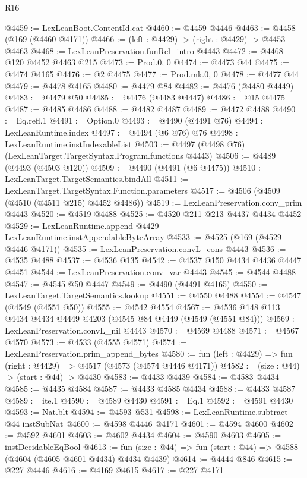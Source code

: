 \begin{lexlean}{R16}
\begin{coremodule}
@4459 := LexLeanBoot.ContentId.cat
@4460 := @4459 @4446
@4463 := @4458 (@169 (@4460 @4171))
@4466 := (left : @4429) -> (right : @4429) -> @4453 @4463
@4468 := LexLeanPreservation.funRel_intro @4443
@4472 := @4468 @120 @4452 @4463 @215
@4473 := Prod.{0, 0}
@4474 := @4473 @44
@4475 := @4474 @4165
@4476 := @2 @4475
@4477 := Prod.mk.{0, 0}
@4478 := @4477 @44
@4479 := @4478 @4165
@4480 := @4479 @84
@4482 := @4476 (@4480 @4449)
@4483 := @4479 @50
@4485 := @4476 (@4483 @4447)
@4486 := @15 @4475
@4487 := @4485 @4486
@4488 := @4482 @4487
@4489 := @4472 @4488
@4490 := Eq.refl.{1}
@4491 := Option.{0}
@4493 := @4490 (@4491 @76)
@4494 := LexLeanRuntime.index
@4497 := @4494 (@6 @76) @76
@4498 := LexLeanRuntime.instIndexableList
@4503 := @4497 (@4498 @76) (LexLeanTarget.TargetSyntax.Program.functions @4443)
@4506 := @4489 (@4493 (@4503 @120))
@4509 := @4490 (@4491 (@6 @4475))
@4510 := LexLeanTarget.TargetSemantics.bindAll
@4511 := LexLeanTarget.TargetSyntax.Function.parameters
@4517 := @4506 (@4509 (@4510 (@4511 @215) @4452 @4486))
@4519 := LexLeanPreservation.conv_prim @4443
@4520 := @4519 @4488
@4525 := @4520 @211 @213 @4437 @4434 @4452
@4529 := LexLeanRuntime.append @4429 LexLeanRuntime.instAppendableByteArray
@4533 := @4525 (@169 (@4529 @4446 @4171))
@4535 := LexLeanPreservation.convL_cons @4443
@4536 := @4535 @4488
@4537 := @4536 @135
@4542 := @4537 @150 @4434 @4436 @4447 @4451
@4544 := LexLeanPreservation.conv_var @4443
@4545 := @4544 @4488
@4547 := @4545 @50 @4447
@4549 := @4490 (@4491 @4165)
@4550 := LexLeanTarget.TargetSemantics.lookup
@4551 := @4550 @4488
@4554 := @4547 (@4549 (@4551 @50))
@4555 := @4542 @4554
@4567 := @4536 @148 @113 @4434 @4434 @4449 @4203 (@4545 @84 @4449 (@4549 (@4551 @84)))
@4569 := LexLeanPreservation.convL_nil @4443
@4570 := @4569 @4488
@4571 := @4567 @4570
@4573 := @4533 (@4555 @4571)
@4574 := LexLeanPreservation.prim_append_bytes
@4580 := fun (left : @4429) => fun (right : @4429) => @4517 (@4573 (@4574 @4446 @4171))
@4582 := (size : @44) -> (start : @44) -> @4430
@4583 := @4433 @4439
@4584 := @4583 @4434
@4585 := @4435 @4584
@4587 := @4433 @4585 @4434
@4588 := @4433 @4587
@4589 := ite.{1}
@4590 := @4589 @4430
@4591 := Eq.{1}
@4592 := @4591 @4430
@4593 := Nat.blt
@4594 := @4593 @531
@4598 := LexLeanRuntime.subtract @44 instSubNat
@4600 := @4598 @4446 @4171
@4601 := @4594 @4600
@4602 := @4592 @4601
@4603 := @4602 @4434
@4604 := @4590 @4603
@4605 := instDecidableEqBool
@4613 := fun (size : @44) => fun (start : @44) => @4588 (@4604 (@4605 @4601 @4434) @4434 @4439)
@4614 := @4444 @846
@4615 := @227 @4446
@4616 := @4169 @4615
@4617 := @227 @4171

\end{coremodule}
\end{lexlean}
